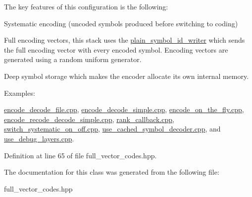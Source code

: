 The key features of this configuration is the following\-:
\begin{DoxyItemize}
\item Systematic encoding (uncoded symbols produced before switching to coding)
\item Full encoding vectors, this stack uses the \hyperlink{classkodo_1_1plain__symbol__id__writer}{plain\-\_\-symbol\-\_\-id\-\_\-writer} which sends the full encoding vector with every encoded symbol. Encoding vectors are generated using a random uniform generator.
\item Deep symbol storage which makes the encoder allocate its own internal memory. 
\end{DoxyItemize}\begin{Desc}
\item[Examples\-: ]\par
\hyperlink{encode_decode_file_8cpp-example}{encode\-\_\-decode\-\_\-file.\-cpp}, \hyperlink{encode_decode_simple_8cpp-example}{encode\-\_\-decode\-\_\-simple.\-cpp}, \hyperlink{encode_on_the_fly_8cpp-example}{encode\-\_\-on\-\_\-the\-\_\-fly.\-cpp}, \hyperlink{encode_recode_decode_simple_8cpp-example}{encode\-\_\-recode\-\_\-decode\-\_\-simple.\-cpp}, \hyperlink{rank_callback_8cpp-example}{rank\-\_\-callback.\-cpp}, \hyperlink{switch_systematic_on_off_8cpp-example}{switch\-\_\-systematic\-\_\-on\-\_\-off.\-cpp}, \hyperlink{use_cached_symbol_decoder_8cpp-example}{use\-\_\-cached\-\_\-symbol\-\_\-decoder.\-cpp}, and \hyperlink{use_debug_layers_8cpp-example}{use\-\_\-debug\-\_\-layers.\-cpp}.\end{Desc}


Definition at line 65 of file full\-\_\-vector\-\_\-codes.\-hpp.



The documentation for this class was generated from the following file\-:\begin{DoxyCompactItemize}
\item 
full\-\_\-vector\-\_\-codes.\-hpp\end{DoxyCompactItemize}
